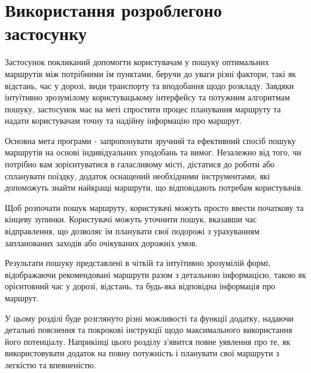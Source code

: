 \section{Використання розроблегоно застосунку}
\label{sec:application-usadge}

Застосунок покликаний допомогти користувачам у пошуку оптимальних маршрутів між потрібними їм пунктами, беручи до уваги різні фактори, такі як відстань, час у дорозі, види транспорту та вподобання щодо розкладу. Завдяки інтуїтивно зрозумілому користувацькому інтерфейсу та потужним алгоритмам пошуку, застосунок має на меті спростити процес планування маршруту та надати користувачам точну та надійну інформацію про маршрут.

Основна мета програми - запропонувати зручний та ефективний спосіб пошуку маршрутів на основі індивідуальних уподобань та вимог. Незалежно від того, чи потрібно вам зорієнтуватися в галасливому місті, дістатися до роботи або спланувати поїздку, додаток оснащений необхідними інструментами, які допоможуть знайти найкращі маршрути, що відповідають потребам користувачів.

Щоб розпочати пошук маршруту, користувачі можуть просто ввести початкову та кінцеву зупинки. Користувачі можуть уточнити пошук, вказавши час відправлення, що дозволяє їм планувати свої подорожі з урахуванням запланованих заходів або очікуваних дорожніх умов.

Результати пошуку представлені в чіткій та інтуїтивно зрозумілій формі, відображаючи рекомендовані маршрути разом з детальною інформацією, такою як орієнтовний час у дорозі, відстань, та будь-яка відповідна інформація про маршрут.

У цьому розділі буде розглянуто різні можливості та функції додатку, надаючи детальні пояснення та покрокові інструкції щодо максимального використання його потенціалу. Наприкінці цього розділу з'явится повне уявлення про те, як використовувати додаток на повну потужність і планувати свої маршрути з легкістю та впевненістю.







